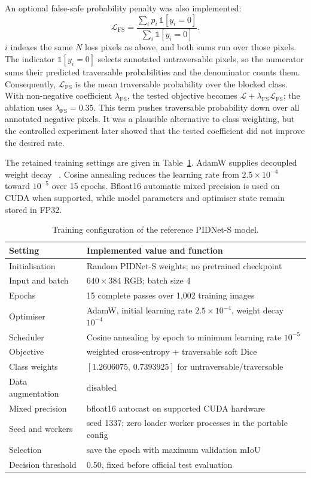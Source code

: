 An optional false-safe probability penalty was also implemented:
\begin{equation}
 \mathcal{L}_{\mathrm{FS}}
 =\frac{\sum_i p_i\,\mathbb{1}[y_i=0]}
 {\sum_i\mathbb{1}[y_i=0]}.
 \label{eq:false_safe_penalty}
\end{equation}
$i$ indexes the same $N$ loss pixels as above, and both sums run over those
pixels. The indicator $\mathbb{1}[y_i=0]$ selects annotated untraversable pixels, so
the numerator sums their predicted traversable probabilities and the
denominator counts them. Consequently, $\mathcal{L}_{\mathrm{FS}}$ is the
mean traversable probability over the blocked class. With non-negative
coefficient $\lambda_{\mathrm{FS}}$, the tested objective becomes
$\mathcal{L}+\lambda_{\mathrm{FS}}\mathcal{L}_{\mathrm{FS}}$; the ablation uses
$\lambda_{\mathrm{FS}}=0.35$.
This term pushes traversable probability down over all annotated negative
pixels. It was a plausible alternative to class weighting, but the controlled
experiment later showed that the tested coefficient did not improve the
desired rate.

The retained training settings are given in
Table~\ref{tab:frozen_pidnet_training}. AdamW supplies decoupled weight decay
~\cite{loshchilov2019adamw}. Cosine annealing reduces the learning rate from
$2.5\times10^{-4}$ toward $10^{-5}$ over 15 epochs. Bfloat16 automatic mixed
precision is used on CUDA when supported, while model parameters and optimiser
state remain stored in FP32.

\begin{table}[H]
\centering
\caption{Training configuration of the reference PIDNet-S model.}
\label{tab:frozen_pidnet_training}
\small
\begin{tabularx}{\textwidth}{@{}lX@{}}
\toprule
\textbf{Setting} & \textbf{Implemented value and function} \\
\midrule
Initialisation & Random PIDNet-S weights; no pretrained checkpoint \\
Input and batch & $640\times384$ RGB; batch size 4 \\
Epochs & 15 complete passes over 1,002 training images \\
Optimiser & AdamW, initial learning rate $2.5\times10^{-4}$, weight decay $10^{-4}$ \\
Scheduler & Cosine annealing by epoch to minimum learning rate $10^{-5}$ \\
Objective & weighted cross-entropy + traversable soft Dice \\
Class weights & $[1.2606075,\,0.7393925]$ for untraversable/traversable \\
Data augmentation & disabled \\
Mixed precision & bfloat16 autocast on supported CUDA hardware \\
Seed and workers & seed 1337; zero loader worker processes in the portable config \\
Selection & save the epoch with maximum validation mIoU \\
Decision threshold & 0.50, fixed before official test evaluation \\
\bottomrule
\end{tabularx}
\end{table}

